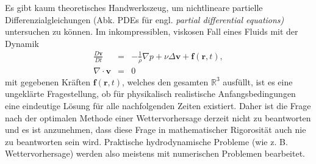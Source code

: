 \documentclass{book}
\newcommand{\md}[1]{\frac{D#1}{Dt}}
\begin{document}
Es gibt kaum theoretisches Handwerkszeug, um nichtlineare partielle Differenzialgleichungen (Abk. PDEs für engl. \textit{partial differential equations)} untersuchen zu können. Im inkompressiblen, viskosen Fall eines Fluids mit der Dynamik
%
\begin{eqnarray}
\md{\mathbf{v}} & = & -\frac{1}{\rho}\nabla p + \nu\Delta\mathbf{v} + \mathbf{f}\left(\mathbf{r}, t\right),\\
\nabla\cdot\mathbf{v} & = & 0
\end{eqnarray}
%
mit gegebenen Kräften $\mathbf{f}\left(\mathbf{r}, t\right)$, welches den gesamten $\mathbb{R}^3$ ausfüllt, ist es eine ungeklärte Fragestellung, ob für physikalisch realistische Anfangsbedingungen eine eindeutige Lösung für alle nachfolgenden Zeiten existiert. Daher ist die Frage nach der optimalen Methode einer Wettervorhersage derzeit nicht zu beantworten und es ist anzunehmen, dass diese Frage in mathematischer Rigorosität auch nie zu beantworten sein wird. Praktische hydrodynamische Probleme (wie z. B. Wettervorhersage) werden also meistens mit numerischen Problemen bearbeitet.
\end{document}
